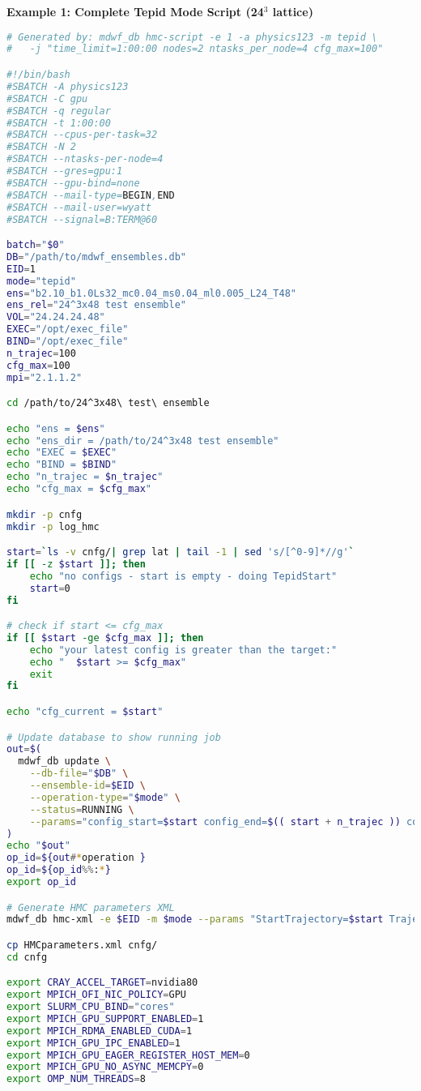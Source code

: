 \documentclass{article}
\begin{document}
\textbf{Example 1: Complete Tepid Mode Script (24$^3$ lattice)}
\begin{lstlisting}[language=bash]
# Generated by: mdwf_db hmc-script -e 1 -a physics123 -m tepid \
#   -j "time_limit=1:00:00 nodes=2 ntasks_per_node=4 cfg_max=100"

#!/bin/bash
#SBATCH -A physics123
#SBATCH -C gpu
#SBATCH -q regular
#SBATCH -t 1:00:00
#SBATCH --cpus-per-task=32
#SBATCH -N 2
#SBATCH --ntasks-per-node=4
#SBATCH --gres=gpu:1
#SBATCH --gpu-bind=none
#SBATCH --mail-type=BEGIN,END
#SBATCH --mail-user=wyatt
#SBATCH --signal=B:TERM@60

batch="$0"
DB="/path/to/mdwf_ensembles.db"
EID=1
mode="tepid"
ens="b2.10_b1.0Ls32_mc0.04_ms0.04_ml0.005_L24_T48"
ens_rel="24^3x48 test ensemble"
VOL="24.24.24.48"
EXEC="/opt/exec_file"
BIND="/opt/exec_file"
n_trajec=100
cfg_max=100
mpi="2.1.1.2"

cd /path/to/24^3x48\ test\ ensemble

echo "ens = $ens"
echo "ens_dir = /path/to/24^3x48 test ensemble"
echo "EXEC = $EXEC"
echo "BIND = $BIND"
echo "n_trajec = $n_trajec"
echo "cfg_max = $cfg_max"

mkdir -p cnfg
mkdir -p log_hmc

start=`ls -v cnfg/| grep lat | tail -1 | sed 's/[^0-9]*//g'`
if [[ -z $start ]]; then
    echo "no configs - start is empty - doing TepidStart"
    start=0
fi

# check if start <= cfg_max
if [[ $start -ge $cfg_max ]]; then
    echo "your latest config is greater than the target:"
    echo "  $start >= $cfg_max"
    exit
fi

echo "cfg_current = $start"

# Update database to show running job
out=$(
  mdwf_db update \
    --db-file="$DB" \
    --ensemble-id=$EID \
    --operation-type="$mode" \
    --status=RUNNING \
    --params="config_start=$start config_end=$(( start + n_trajec )) config_increment=$n_trajec slurm_job=$SLURM_JOB_ID exec_path=$EXEC bind_script=$BIND"
)
echo "$out"
op_id=${out#*operation }
op_id=${op_id%%:*}
export op_id

# Generate HMC parameters XML
mdwf_db hmc-xml -e $EID -m $mode --params "StartTrajectory=$start Trajectories=$n_trajec"

cp HMCparameters.xml cnfg/
cd cnfg

export CRAY_ACCEL_TARGET=nvidia80
export MPICH_OFI_NIC_POLICY=GPU
export SLURM_CPU_BIND="cores"
export MPICH_GPU_SUPPORT_ENABLED=1
export MPICH_RDMA_ENABLED_CUDA=1
export MPICH_GPU_IPC_ENABLED=1
export MPICH_GPU_EAGER_REGISTER_HOST_MEM=0
export MPICH_GPU_NO_ASYNC_MEMCPY=0
export OMP_NUM_THREADS=8


\end{lstlisting}
\end{document}
